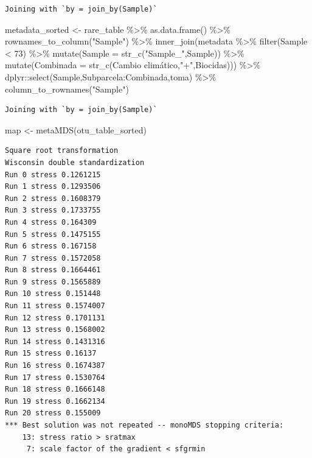 \documentclass[
  letterpaper,
  DIV=11,
  numbers=noendperiod]{scrartcl}
\newenvironment{Shaded}{\begin{snugshade}}{\end{snugshade}}
\newcommand{\AttributeTok}[1]{\textcolor[rgb]{0.40,0.45,0.13}{#1}}
\newcommand{\DecValTok}[1]{\textcolor[rgb]{0.68,0.00,0.00}{#1}}
\newcommand{\FunctionTok}[1]{\textcolor[rgb]{0.28,0.35,0.67}{#1}}
\newcommand{\NormalTok}[1]{\textcolor[rgb]{0.00,0.23,0.31}{#1}}
\newcommand{\OtherTok}[1]{\textcolor[rgb]{0.00,0.23,0.31}{#1}}
\newcommand{\SpecialCharTok}[1]{\textcolor[rgb]{0.37,0.37,0.37}{#1}}
\newcommand{\StringTok}[1]{\textcolor[rgb]{0.13,0.47,0.30}{#1}}
\begin{document}
\begin{verbatim}
Joining with `by = join_by(Sample)`
\end{verbatim}

\begin{Shaded}
\begin{Highlighting}[]
\NormalTok{metadata\_sorted }\OtherTok{\textless{}{-}}\NormalTok{ rare\_table }\SpecialCharTok{\%\textgreater{}\%} 
  \FunctionTok{as.data.frame}\NormalTok{() }\SpecialCharTok{\%\textgreater{}\%} 
  \FunctionTok{rownames\_to\_column}\NormalTok{(}\StringTok{"Sample"}\NormalTok{) }\SpecialCharTok{\%\textgreater{}\%} 
  \FunctionTok{inner\_join}\NormalTok{(metadata }\SpecialCharTok{\%\textgreater{}\%} 
               \FunctionTok{filter}\NormalTok{(Sample }\SpecialCharTok{\textless{}} \DecValTok{73}\NormalTok{) }\SpecialCharTok{\%\textgreater{}\%} 
               \FunctionTok{mutate}\NormalTok{(}\AttributeTok{Sample =} \FunctionTok{str\_c}\NormalTok{(}\StringTok{"Sample\_"}\NormalTok{,Sample)) }\SpecialCharTok{\%\textgreater{}\%} 
               \FunctionTok{mutate}\NormalTok{(}\AttributeTok{Combinada =} \FunctionTok{str\_c}\NormalTok{(}\StringTok{\textasciigrave{}}\AttributeTok{Cambio climático}\StringTok{\textasciigrave{}}\NormalTok{,}\StringTok{"+"}\NormalTok{,Biocidas))) }\SpecialCharTok{\%\textgreater{}\%} 
\NormalTok{  dplyr}\SpecialCharTok{::}\FunctionTok{select}\NormalTok{(Sample,Subparcela}\SpecialCharTok{:}\NormalTok{Combinada,toma) }\SpecialCharTok{\%\textgreater{}\%} \FunctionTok{column\_to\_rownames}\NormalTok{(}\StringTok{"Sample"}\NormalTok{)}
\end{Highlighting}
\end{Shaded}

\begin{verbatim}
Joining with `by = join_by(Sample)`
\end{verbatim}

\begin{Shaded}
\begin{Highlighting}[]
\NormalTok{map }\OtherTok{\textless{}{-}} \FunctionTok{metaMDS}\NormalTok{(otu\_table\_sorted)}
\end{Highlighting}
\end{Shaded}

\begin{verbatim}
Square root transformation
Wisconsin double standardization
Run 0 stress 0.1261215 
Run 1 stress 0.1293506 
Run 2 stress 0.1608379 
Run 3 stress 0.1733755 
Run 4 stress 0.164309 
Run 5 stress 0.1475155 
Run 6 stress 0.167158 
Run 7 stress 0.1572058 
Run 8 stress 0.1664461 
Run 9 stress 0.1565889 
Run 10 stress 0.151448 
Run 11 stress 0.1574007 
Run 12 stress 0.1701131 
Run 13 stress 0.1568002 
Run 14 stress 0.1431316 
Run 15 stress 0.16137 
Run 16 stress 0.1674387 
Run 17 stress 0.1530764 
Run 18 stress 0.1666148 
Run 19 stress 0.1662134 
Run 20 stress 0.155009 
*** Best solution was not repeated -- monoMDS stopping criteria:
    13: stress ratio > sratmax
     7: scale factor of the gradient < sfgrmin
\end{verbatim}
\end{document}
